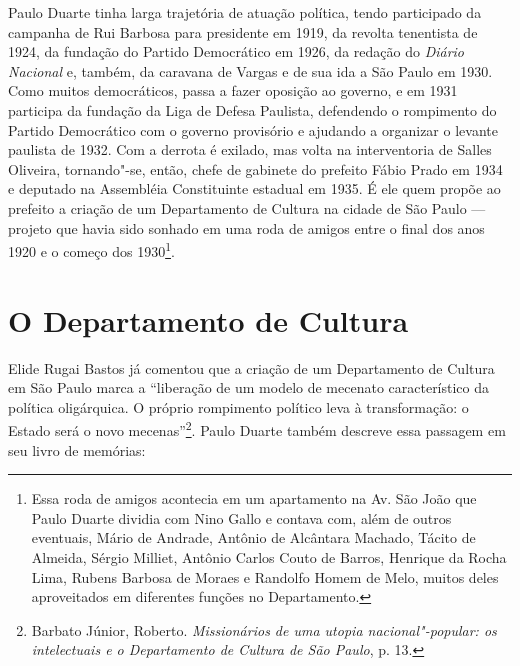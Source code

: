 Paulo Duarte tinha larga trajetória de atuação política, tendo
participado da campanha de Rui Barbosa para presidente em 1919, da
revolta tenentista de 1924, da fundação do Partido Democrático em 1926,
da redação do \emph{Diário Nacional} e, também, da caravana de Vargas e
de sua ida a São Paulo em 1930. Como muitos democráticos, passa a fazer
oposição ao governo, e em 1931 participa da fundação da Liga de Defesa
Paulista, defendendo o rompimento do Partido Democrático com o governo
provisório e ajudando a organizar o levante paulista de 1932. Com a
derrota é exilado, mas volta na interventoria de Salles Oliveira,
tornando"-se, então, chefe de gabinete do prefeito Fábio Prado em 1934 e
deputado na Assembléia Constituinte estadual em 1935. É ele quem propõe
ao prefeito a criação de um Departamento de Cultura na cidade de São
Paulo --- projeto que havia sido sonhado em uma roda de amigos entre o
final dos anos 1920 e o começo dos 1930\footnote{Essa roda de amigos
  acontecia em um apartamento na Av. São João que Paulo Duarte dividia
  com Nino Gallo e contava com, além de outros eventuais, Mário de
  Andrade, Antônio de Alcântara Machado, Tácito de Almeida, Sérgio
  Milliet, Antônio Carlos Couto de Barros, Henrique da Rocha Lima,
  Rubens Barbosa de Moraes e Randolfo Homem de Melo, muitos deles
  aproveitados em diferentes funções no Departamento.}.

\section*{O Departamento de Cultura}

Elide Rugai Bastos já comentou que a criação de um Departamento de
Cultura em São Paulo marca a ``liberação de um modelo de mecenato
característico da política oligárquica. O próprio rompimento político
leva à transformação: o Estado será o novo mecenas''\footnote{Barbato
  Júnior, Roberto. \emph{Missionários de uma utopia nacional"-popular: os
  intelectuais e o Departamento de Cultura de São Paulo}, p. 13.}. Paulo
Duarte também descreve essa passagem em seu livro de memórias:

\begin{quote}
\end{quote}

